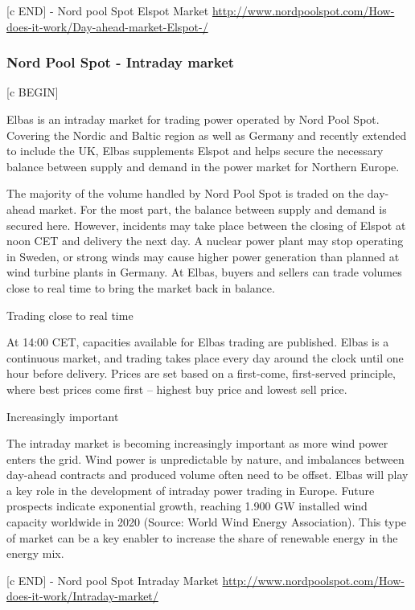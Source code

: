 [c END] - Nord pool Spot Elspot Market \url{http://www.nordpoolspot.com/How-does-it-work/Day-ahead-market-Elspot-/}



\subsubsection{Nord Pool Spot - Intraday market}

[c BEGIN]

Elbas  is an intraday market for trading power operated by Nord Pool Spot. Covering the Nordic and Baltic region as well as Germany and recently extended to include the UK, Elbas supplements Elspot and helps secure the necessary balance between supply and demand in the power market for Northern Europe.

The majority of the volume handled by Nord Pool Spot is traded on the day-ahead market. For the most part, the balance between supply and demand is secured here. However, incidents may take place between the closing of Elspot at noon CET and delivery the next day. A nuclear power plant may stop operating in Sweden, or strong winds may cause higher power generation than planned at wind turbine plants in Germany. At Elbas, buyers and sellers can trade volumes close to real time to bring the market back in balance.

Trading close to real time

At 14:00 CET, capacities available for Elbas trading are published. Elbas is a continuous market, and trading takes place every day around the clock until one hour before delivery. Prices are set based on a first-come, first-served principle, where best prices come first – highest buy price and lowest sell price.

Increasingly important

The intraday market is becoming increasingly important as more wind power enters the grid. Wind power is unpredictable by nature, and imbalances between day-ahead contracts and produced volume often need to be offset. Elbas will play a key role in the development of intraday power trading in Europe. Future prospects indicate exponential growth, reaching 1.900 GW installed wind capacity worldwide in 2020 (Source: World Wind Energy Association). This type of market can be a key enabler to increase the share of renewable energy in the energy mix. 

[c END] - Nord pool Spot Intraday Market \url{http://www.nordpoolspot.com/How-does-it-work/Intraday-market/}




